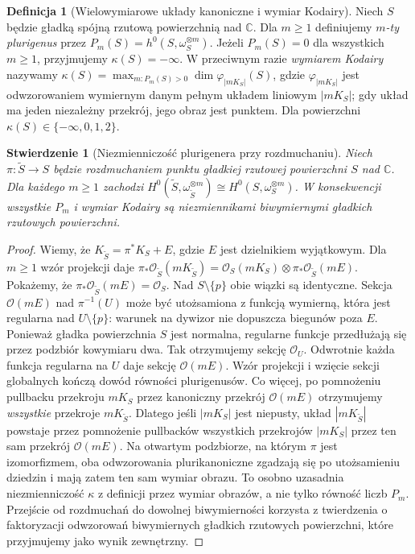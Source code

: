 \documentclass[11pt,a4paper,openany]{report}
\numberwithin{equation}{section}
\theoremstyle{plain}
\newtheorem{stwierdzenie}[twierdzenie]{Stwierdzenie}
\theoremstyle{definition}
\newtheorem{definicja}[twierdzenie]{Definicja}
\theoremstyle{remark}
\newcommand{\C}{\mathbb C}
\begin{document}
\begin{definicja}[Wielowymiarowe układy kanoniczne i wymiar Kodairy]
\label{def:ga8-kodaira}
Niech $S$ będzie gładką spójną rzutową powierzchnią
nad $\C$. Dla $m\ge1$ definiujemy \emph{$m$-ty
plurigenus} przez $P_m(S)=h^0(S,\omega_S^{\otimes m})$.
Jeżeli $P_m(S)=0$ dla wszystkich $m\ge1$, przyjmujemy
$\kappa(S)=-\infty$. W przeciwnym razie
\emph{wymiarem Kodairy} nazywamy
$\kappa(S)=\max_{m:P_m(S)>0}\dim \varphi_{|mK_S|}(S)$,
gdzie $\varphi_{|mK_S|}$ jest odwzorowaniem wymiernym
danym pełnym układem liniowym $|mK_S|$; gdy układ
ma jeden niezależny przekrój, jego obraz jest punktem.
Dla powierzchni $\kappa(S)\in\{-\infty,0,1,2\}$.
\end{definicja}

\begin{stwierdzenie}[Niezmienniczość plurigenera przy rozdmuchaniu]
\label{st:ga8-plurigenera-blowup}
Niech $\pi:\widetilde S\to S$ będzie rozdmuchaniem
punktu gładkiej rzutowej powierzchni $S$ nad $\C$.
Dla każdego $m\ge1$ zachodzi
$H^0(\widetilde S,\omega_{\widetilde S}^{\otimes m})
\cong H^0(S,\omega_S^{\otimes m})$.
W konsekwencji wszystkie $P_m$ i wymiar Kodairy
są niezmiennikami biwymiernymi gładkich
rzutowych powierzchni.
\end{stwierdzenie}
\begin{proof}
Wiemy, że $K_{\widetilde S}=\pi^*K_S+E$,
gdzie $E$ jest dzielnikiem wyjątkowym. Dla $m\ge1$
wzór projekcji daje
$\pi_*\mathcal O_{\widetilde S}(mK_{\widetilde S})
=\mathcal O_S(mK_S)\otimes\pi_*\mathcal O_{\widetilde S}(mE)$.
Pokażemy, że $\pi_*\mathcal O_{\widetilde S}(mE)
=\mathcal O_S$. Nad $S\setminus\{p\}$ obie wiązki
są identyczne. Sekcja $\mathcal O(mE)$ nad
$\pi^{-1}(U)$ może być utożsamiona z funkcją wymierną,
która jest regularna nad $U\setminus\{p\}$:
warunek na dywizor nie dopuszcza biegunów poza $E$.
Ponieważ gładka powierzchnia $S$ jest normalna,
regularne funkcje przedłużają się przez podzbiór
kowymiaru dwa. Tak otrzymujemy sekcję $\mathcal O_U$.
Odwrotnie każda funkcja regularna na $U$ daje
sekcję $\mathcal O(mE)$. Wzór projekcji i wzięcie
sekcji globalnych kończą dowód równości plurigenusów.
Co więcej, po pomnożeniu pullbacku przekroju $mK_S$
przez kanoniczny przekrój $\mathcal O(mE)$ otrzymujemy
\emph{wszystkie} przekroje $mK_{\widetilde S}$. Dlatego
jeśli $|mK_S|$ jest niepusty, układ $|mK_{\widetilde S}|$
powstaje przez pomnożenie pullbacków wszystkich przekrojów
$|mK_S|$ przez ten sam przekrój $\mathcal O(mE)$.
Na otwartym podzbiorze, na którym $\pi$ jest izomorfizmem,
oba odwzorowania plurikanoniczne zgadzają się po utożsamieniu
dziedzin i mają zatem ten sam wymiar obrazu.
To osobno uzasadnia niezmienniczość $\kappa$ z definicji
przez wymiar obrazów, a nie tylko równość liczb $P_m$.
Przejście od rozdmuchań do dowolnej biwymierności
korzysta z twierdzenia o faktoryzacji odwzorowań
biwymiernych gładkich rzutowych powierzchni,
które przyjmujemy jako wynik zewnętrzny.
\end{proof}
\end{document}
